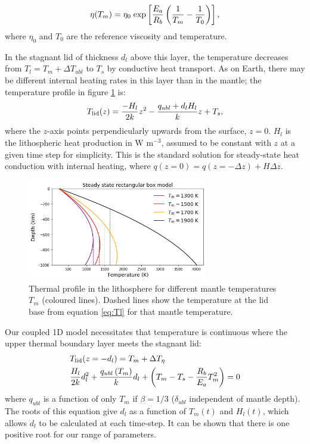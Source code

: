 \documentclass[10pt,a4paper]{article}
\begin{document}
\begin{equation}
\eta(T_m) = \eta_0 \; {\rm exp}\left[\frac{E_a}{R_b}\left(\frac{1}{T_m} - \frac{1}{T_0}\right)\right],
\end{equation} 
where $\eta_0$ and $T_0$ are the reference viscosity and temperature.

In the stagnant lid of thickness $d_l$ above this layer, the temperature decreases from $T_l = T_m + \Delta T_{ubl}$ to $T_s$ by conductive heat transport. As on Earth, there may be different internal heating rates in this layer than in the mantle; the temperature profile in figure \ref{fig:T_z} is:
\begin{equation}
T_{\rm lid}(z) = \frac{-H_l}{2k}z^2 - \frac{q_{ubl} +d_l H_l}{k}z + T_s,
\end{equation}
where the $z$-axis points perpendicularly upwards from the surface, $z=0$. $H_l$ is the lithospheric heat production in W m$^{-3}$, assumed to be constant with $z$ at a given time step for simplicity. This is the standard solution for steady-state heat conduction with internal heating, where $q(z=0) = q(z=-\Delta z) + H \Delta z$.

\begin{figure}
\centering
\includegraphics[width=0.7\textwidth]{../T_z.png} 
 \caption{Thermal profile in the lithosphere for different mantle temperatures $T_m$ (coloured lines). Dashed lines show the temperature at the lid base from equation \ref{eq:Tl} for that mantle temperature. \label{fig:T_z}}
\end{figure}

Our coupled 1D model necessitates that temperature is continuous where the upper thermal boundary layer meets the stagnant lid:
\begin{align}
\label{eq:t-continuity}
&T_{\rm lid}(z=-d_l) = T_m + \Delta T_\eta \\
&\frac{H_l}{2k}d_l^2 + \frac{q_{ubl}\left(T_m\right)}{k}d_l + \left(T_m - T_s - \frac{R_b}{E_a}T_m^2\right)  = 0
\end{align}
where $q_{ubl}$ is a function of only $T_m$ if $\beta=1/3$ ($\delta_{ubl}$ independent of mantle depth). The roots of this equation give $d_l$ as a function of $T_m(t)$ and $H_l(t)$, which allows $d_l$ to be calculated at each time-step. It can be shown that there is one positive root for our range of parameters. 
\end{document}
